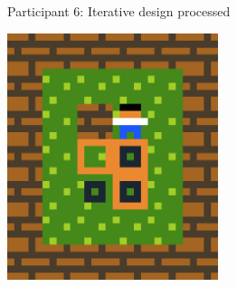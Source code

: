 \begin{figure}[!htbp]
\begin{minipage}[t]{0.2\textwidth}
\end{minipage}
\caption{Participant 6: Iterative design processed \label{fig:part6iterative}}
\end{figure}



\begin{figure}[!htbp]
\begin{minipage}{0.5\textwidth}
\centering
\includegraphics[width=0.55\textwidth]{figures/sokobaniteratelevel.png}


\end{minipage}
\end{figure}
